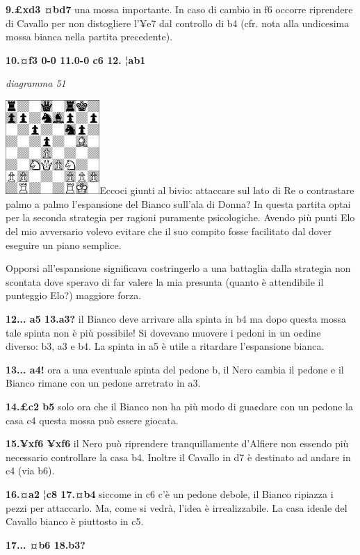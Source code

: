 \documentclass[
]{article}
\begin{document}
\textbf{9.£xd3 ¤bd7} una mossa importante. In caso di cambio in f6
occorre riprendere di Cavallo per non distogliere l'¥e7 dal controllo di
b4 (cfr. nota alla undicesima mossa bianca nella partita precedente).

\textbf{10.¤f3 0-0 11.0-0 c6 12. ¦ab1}

\emph{diagramma 51}

\includegraphics[width=1.40972in,height=1.40972in]{vertopal_109f12be458a423d8f3cc838880eaea2/media/image51.png}Eccoci
giunti al bivio: attaccare sul lato di Re o contrastare palmo a palmo
l'espansione del Bianco sull'ala di Donna? In questa partita optai per
la seconda strategia per ragioni puramente psicologiche. Avendo più
punti Elo del mio avversario volevo evitare che il suo compito fosse
facilitato dal dover eseguire un piano semplice.

Opporsi all'espansione significava costringerlo a una battaglia dalla
strategia non scontata dove speravo di far valere la mia presunta
(quanto è attendibile il punteggio Elo?) maggiore forza.

\textbf{12... a5 13.a3?} il Bianco deve arrivare alla spinta in b4 ma
dopo questa mossa tale spinta non è più possibile! Si dovevano muovere i
pedoni in un o¢dine diverso: b3, a3 e b4. La spinta in a5 è utile a
ritardare l'espansione bianca.

\textbf{13... a4!} ora a una eventuale spinta del pedone b, il Nero
cambia il pedone e il Bianco rimane con un pedone arretrato in a3.

\textbf{14.£c2 b5} solo ora che il Bianco non ha più modo di gua¢dare
con un pedone la casa c4 questa mossa può essere giocata.

\textbf{15.¥xf6 ¥xf6} il Nero può riprendere tranquillamente d'Alfiere
non essendo più necessario controllare la casa b4. Inoltre il Cavallo in
d7 è destinato ad andare in c4 (via b6).

\textbf{16.¤a2 ¦c8 17.¤b4} siccome in c6 c'è un pedone debole, il Bianco
ripiazza i pezzi per attaccarlo. Ma, come si vedrà, l'idea è
irrealizzabile. La casa ideale del Cavallo bianco è piuttosto in c5.

\textbf{17... ¤b6 18.b3?}
\end{document}
